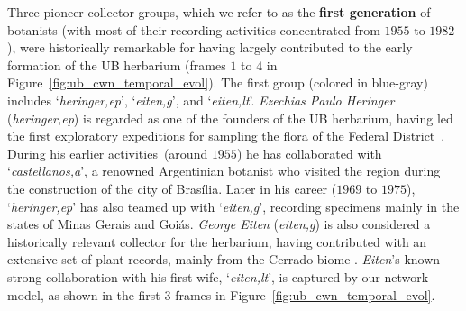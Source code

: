 Three pioneer collector groups, which we refer to as the \textbf{first generation} of botanists (with most of their recording activities concentrated from $1955$ to $1982$), were historically remarkable for having largely contributed to the early formation of the UB herbarium (frames $1$ to $4$ in Figure~\ref{fig:ub_cwn_temporal_evol}).
The first group (colored in blue-gray) includes `\textit{heringer,ep}', `\textit{eiten,g}', and `\textit{eiten,lt}'.
\textit{Ezechias Paulo Heringer} (\textit{heringer,ep}) is regarded as one of the founders of the UB herbarium, having led the first exploratory expeditions for sampling the flora of the Federal District~\cite{Walter2001}.
During his earlier activities~(around $1955$) he has collaborated with `\textit{castellanos,a}', a renowned Argentinian botanist who visited the region during the construction of the city of Brasília.
Later in his career ($1969$ to $1975$), `\textit{heringer,ep}' has also teamed up with `\textit{eiten,g}', recording specimens mainly in the states of Minas Gerais and Goiás.
\textit{George Eiten} (\textit{eiten,g}) is also considered a historically relevant collector for the herbarium, having contributed with an extensive set of plant records, mainly from the Cerrado biome \cite{Gomes2012}.
\textit{Eiten}'s known strong collaboration with his first wife, `\textit{eiten,lt}', is captured by our network model, as shown in the first $3$ frames in Figure~\ref{fig:ub_cwn_temporal_evol}.

